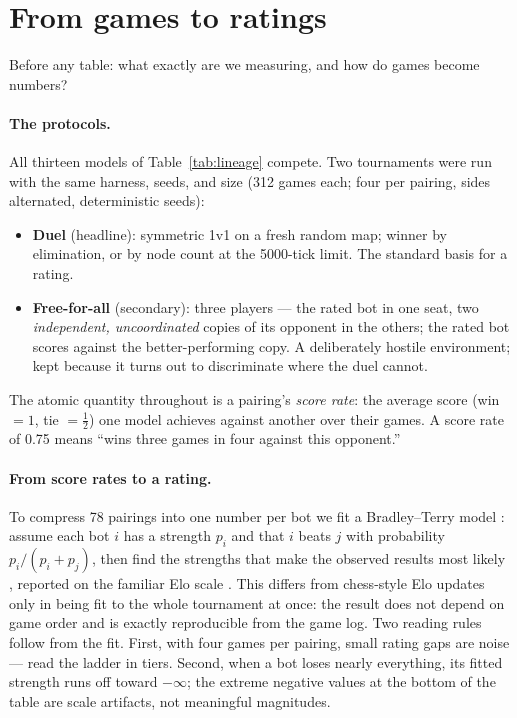 
\section{From games to ratings}
\label{sec:elo-protocol}

Before any table: what exactly are we measuring, and how do games become
numbers?

\paragraph{The protocols.} All thirteen models of Table~\ref{tab:lineage}
compete. Two tournaments were run with the same harness, seeds, and size
(312 games each; four per pairing, sides alternated, deterministic seeds):

\begin{itemize}
  \item \textbf{Duel} (headline): symmetric 1v1 on a fresh random map;
    winner by elimination, or by node count at the 5000-tick limit. The
    standard basis for a rating.
  \item \textbf{Free-for-all} (secondary): three players --- the rated bot
    in one seat, two \emph{independent, uncoordinated} copies of its
    opponent in the others; the rated bot scores against the
    better-performing copy. A deliberately hostile environment; kept
    because it turns out to discriminate where the duel cannot.
\end{itemize}

The atomic quantity throughout is a pairing's \emph{score rate}: the
average score (win $=1$, tie $=\tfrac12$) one model achieves against
another over their games. A score rate of 0.75 means ``wins three games in
four against this opponent.''

\paragraph{From score rates to a rating.} To compress 78 pairings into one
number per bot we fit a Bradley--Terry model \citep{bradleyterry1952}:
assume each bot $i$ has a strength $p_i$ and that $i$ beats $j$ with
probability $p_i/(p_i+p_j)$, then find the strengths that make the observed
results most likely \citep{hunter2004}, reported on the familiar Elo scale
\citep{elo1978}. This differs from chess-style Elo updates only in being
fit to the whole tournament at once: the result does not depend on game
order and is exactly reproducible from the game log. Two reading rules
follow from the fit. First, with four games per pairing, small rating gaps
are noise --- read the ladder in tiers. Second, when a bot loses nearly
everything, its fitted strength runs off toward $-\infty$; the extreme
negative values at the bottom of the table are scale artifacts, not
meaningful magnitudes.

